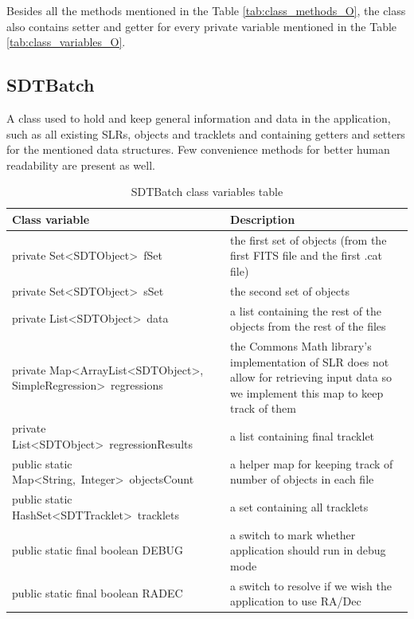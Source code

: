 	Besides all the methods mentioned in the Table \ref{tab:class_methods_O}, the class also contains setter and getter for every private variable mentioned in the Table \ref{tab:class_variables_O}.

\subsection{SDTBatch}\label{subsec:batch}

	A class used to hold and keep general information and data in the application, such as all existing SLRs, objects and tracklets and containing getters and setters for the mentioned data structures. Few convenience methods for better human readability are present as well.
	
\begin{table}[H]
\centering
\setlength{\extrarowheight}{2pt}
\begin{tabularx}{\textwidth}{|X|X|}
\hline
\textbf{Class variable} & \textbf{Description} \\ \hline
private \mbox{Set<SDTObject> fSet} & the first set of objects (from the first FITS file and the first .cat file) \\ \hline
private \mbox{Set<SDTObject> sSet} & the second set of objects \\ \hline
private \mbox{List<SDTObject> data} & a list containing the rest of the objects from the rest of the files \\ \hline
private \mbox{Map<ArrayList<SDTObject>,} \mbox{SimpleRegression> regressions} & the Commons Math library's implementation of SLR does not allow for retrieving input data so we implement this map to keep track of them \\ \hline
private \mbox{List<SDTObject> regressionResults} & a list containing final tracklet \\ \hline
public static \mbox{Map<String, Integer> objectsCount} & a helper map for keeping track of number of objects in each file \\ \hline
public static \mbox{HashSet<SDTTracklet> tracklets} & a set containing all tracklets \\ \hline
public static final boolean \mbox{DEBUG} & a switch to mark whether application should run in debug mode \\ \hline
public static final boolean \mbox{RADEC} & a switch to resolve if we wish the application to use RA/Dec \\ \hline
\end{tabularx}
\caption{SDTBatch class variables table}
\label{tab:class_variables_B}
\end{table}

